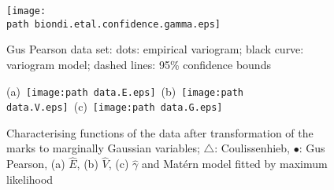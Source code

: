 \documentclass[10pt]{article}
\begin{document}
\def\FigOne#1{Gus Pearson data set: dots: empirical variogram; black curve:
 variogram model; dashed lines: 95\% confidence bounds \label{fig:#1}}
\begin{figure}
 \hfil \texttt{[image: \\path
   biondi.etal.confidence.gamma.eps]}\hfill 
 \caption{\FigOne{confidence}}
\end{figure}

\def\FigO#1{ Characterising functions of the
 data after transformation of the marks to marginally
 Gaussian variables;
 $\bigtriangleup$: Coulissenhieb, $\bullet$: Gus Pearson, 
 (a) $\hat E$, (b) $\hat V$, (c) $\hat \gamma$ and Mat\'ern model
 fitted by maximum likelihood
 \label{fig:#1}}
\begin{figure}
  \hbox{(a) \texttt{[image: \\path data.E.eps]} 
    (b) \texttt{[image: \\path data.V.eps]}
    (c) \texttt{[image: \\path data.G.eps]}}
  \caption{\FigO{data.EVG}}
\end{figure}

\clearpage
\end{document}
